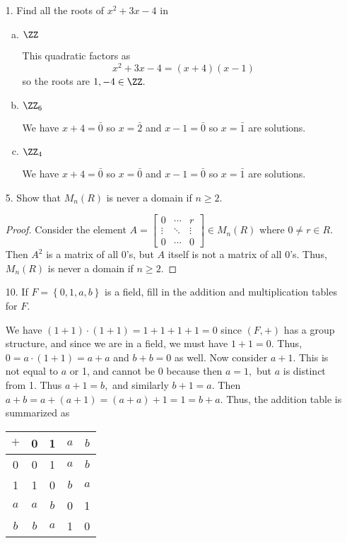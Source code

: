 \documentclass{article}
\begin{document}
\begin{itemize}
	\item[1.] Find all the roots of $x^2+3x-4$ in
		\begin{enumerate}[(a)]
			\item $\ZZ$
				\begin{soln}
					This quadratic factors as \[x^2+3x-4=(x+4)(x-1)\] so the roots are $1, -4\in \ZZ.$
				\end{soln}

			\item $\ZZ_6$
				\begin{soln}
					We have $x+4=\bar{0}$ so $x=\bar{2}$ and $x-1=\bar{0}$ so $x=\bar{1}$ are solutions. 
				\end{soln}

			\item $\ZZ_4$
				\begin{soln}
					We have $x+4=\bar{0}$ so $x=\bar{0}$ and $x-1=\bar{0}$ so $x=\bar{1}$ are solutions. 
				\end{soln}
				
		\end{enumerate}

	\item[5.] Show that $M_n(R)$ is never a domain if $n\ge 2.$
		\begin{proof}
			Consider the element $A=\begin{bmatrix}
				0 & \cdots & r \\
				\vdots & \ddots & \vdots \\
				0 & \cdots & 0
			\end{bmatrix}\in M_n(R)$ where $0\neq r\in R.$ Then $A^2$ is a matrix of all 0's, but $A$ itself is not a matrix of all 0's. Thus, $M_n(R)$ is never a domain if $n\ge 2.$
		\end{proof}

	\item[10.] If $F=\left\{ 0, 1, a, b \right\}$ is a field, fill in the addition and multiplication tables for $F.$
		\begin{soln}
			We have $(1+1)\cdot(1+1)=1+1+1+1=0$ since $(F, +)$ has a group structure, and since we are in a field, we must have $1+1=0.$ Thus, $0=a\cdot(1+1)=a+a$ and $b+b=0$ as well. Now consider $a+1.$ This is not equal to $a$ or 1, and cannot be 0 because then $a=1,$ but $a$ is distinct from 1. Thus $a+1=b,$ and similarly $b+1=a.$ Then $a+b=a+(a+1)=(a+a)+1=1=b+a.$ Thus, the addition table is summarized as
			\begin{center}
				\begin{tabular}{c|cccc}
					$+$ & 0 & 1 & $a$ & $b$ \\
					\hline
					0 & 0 & 1 & $a$ & $b$ \\
					1 & 1 & 0 & $b$ & $a$ \\
					$a$ & $a$ & $b$ & 0 & 1 \\
					$b$ & $b$ & $a$ & 1 & 0
				\end{tabular}
			\end{center}


\end{soln}
\end{itemize}
\end{document}
